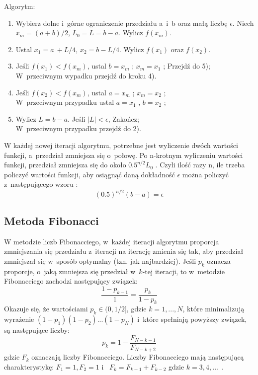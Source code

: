 \documentclass{classrep}
\begin{document}
\noindent Algorytm:
\begin{enumerate}
\item Wybierz dolne i~górne ograniczenie przedziału a~i~b oraz małą liczbę $\epsilon$. Niech $x_m = (a + b)/2$, $L_0 =L=b-a$. Wylicz $f(x_m )$.
\item Ustal $x_1 = a~+ L/4$, $x_2 = b - L/4$. Wylicz $f(x_1 )$ oraz $f(x_2 )$.
\item Jeśli $f(x_1 ) < f(x_m )$, ustal $b = x_m$ ; $x_m = x_1$ ; Przejdź do 5);\\
 W~przeciwnym wypadku przejdź do kroku 4).
\item Jeśli $f(x_2 ) < f(x_m )$, ustal $a = x_m$ ; $x_m = x_2$ ;\\
 W~przeciwnym przypadku ustal $a = x_1$ , $b = x_2$ ;
\item Wylicz $L = b - a$. Jeśli $|L| < \epsilon$, Zakończ;\\
 W~przeciwnym przypadku przejdź do 2).
\end{enumerate}

W każdej nowej iteracji algorytmu, potrzebne jest wyliczenie dwóch wartości funkcji, a~przedział zmniejsza się o~połowę. Po n-krotnym wyliczeniu wartości funkcji, przedział zmniejsza się do około $0.5^{n/2} L_0$ . Czyli ilość razy n, ile trzeba policzyć wartości funkcji, aby osiągnąć daną dokładność $\epsilon$ można policzyć z~następującego wzoru : 
\begin{equation}
(0.5)^{n/2} (b - a) = \epsilon
\end{equation}

\subsection{Metoda Fibonacci \cite{1}}
W metodzie liczb Fibonacciego, w~każdej iteracji algorytmu proporcja zmniejszania się przedziału z~iteracji na iterację zmienia się tak, aby przedział zmniejszał się w~sposób optymalny (tzn. jak najbardziej). Jeśli $p_k$ oznacza proporcje, o~jaką zmniejsza się przedział w~$k$-tej iteracji, to w~metodzie Fibonacciego zachodzi następujący związek:
\begin{equation}
\frac{1-p_{k-1}}{1} = \frac{p_k}{1-p_k}
\end{equation}
Okazuje się, że wartościami $p_k \in (0, 1/2]$, gdzie $k = 1,...,N$, które minimalizują wyrażenie $(1-p_1)(1-p_2)...(1-p_N)$ i~które spełniają powyższy związek, są następujące liczby:
\begin{equation}
p_k=1-\frac{F_{N-k-1}}{F_{N-k+2}}
\end{equation}
gdzie $F_k$ oznaczają liczby Fibonacciego. Liczby Fibonacciego mają następującą charakterystykę: $F_1=1, F_2=1$ i~ $F_k=F_{k-1}+F_{k-2}$ gdzie $k=3,4,...$~.
\end{document}
